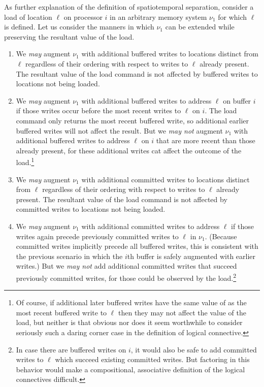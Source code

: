 \documentclass[11pt]{report}
\begin{document}
As further explanation of the definition of spatiotemporal separation, consider a load of location $\ell$ on processor $i$ in an arbitrary memory system $\nu_1$ for which $\ell$ is defined. Let us consider the manners in which $\nu_1$ can be extended while preserving the resultant value of the load. \begin{enumerate}

  \item We \emph{may} augment $\nu_1$ with additional buffered writes to locations distinct from $\ell$ regardless of their ordering with respect to writes to $\ell$ already present. The resultant value of the load command is not affected by buffered writes to locations not being loaded. 

  \item We \emph{may} augment $\nu_1$ with additional buffered writes to address $\ell$ on buffer $i$ if those writes occur before the most recent writes to $\ell$ on $i$. The load command only returns the most recent buffered write, so additional earlier buffered writes will not affect the result. But we \emph{may not} augment $\nu_1$ with additional buffered writes to address $\ell$ on $i$ that are more recent than those already present, for these additional writes cat affect the outcome of the load.\footnote{Of course, if additional later buffered writes have the same value of as the most recent buffered write to $\ell$ then they may not affect the value of the load, but neither is that obvious nor does it seem worthwhile to consider seriously such a daring corner case in the definition of logical connective.} 
  
  \item We \emph{may} augment $\nu_1$ with additional committed writes to locations distinct from $\ell$ regardless of their ordering with respect to writes to $\ell$ already present. The resultant value of the load command is not affected by committed writes to locations not being loaded.  
  \item We \emph{may} augment $\nu_1$ with additional committed writes to address $\ell$ if those writes again precede previously committed writes to $\ell$ in $\nu_1$. (Because committed writes implicitly precede all buffered writes, this is consistent with the previous scenario in which the $i$th buffer is safely augmented with earlier writes.) But we \emph{may not} add additional committed writes that succeed previously committed writes, for those could be observed by the load.\footnote{In case there are buffered writes on $i$, it would also be safe to add committed writes to $\ell$ which succeed existing committed writes. But factoring in this behavior would make a compositional, associative definition of the logical connectives difficult.} 
    

\end{enumerate}
\end{document}

